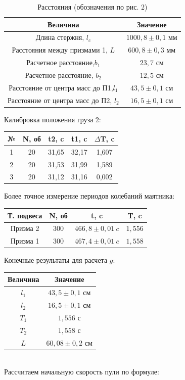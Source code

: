 \documentclass[a4paper]{article}
\begin{document}
\begin{table}[!h]
\centering
\caption{Расстояния (обозначения по рис. 2)}
\begin{tabular}{|c|c|}        \hline
Величина & Значение\\  \hline
Длина стержня, $l_c$ & $1000,8\pm 0,1$ мм\\ \hline
Расстояния между призмами 1, $L$ & $600,8\pm 0,3$ мм\\ \hline
Расчетное расстояние,$ b_1$ & $23,7$ см\\ \hline
Расчетное расстояние, $b_2$ & $12,5$ см\\ \hline
Расстояние от центра масс до П1,$l_1$ & $43,5\pm 0,1$ см\\ \hline
Расстояние от центра масс до П2, $l_2$ & $16,5\pm 0,1$ см\\ \hline
\end{tabular}
\end{table}

\noindent Калибровка положения груза 2:
\begin{table}[!h]
\centering
\begin{tabular}{|c|c|c|c|c|}      
\hline
№ & N, об & t2, c & t1, c & $\Delta$T, c \\  \hline
1 & 20 & 31,65 & 32,17 & 1,607 \\ \hline
2 & 20 & 31,53 & 31,99 & 1,589 \\ \hline
3 & 20 & 31,12 & 31,16 & 0,002\\ \hline
\end{tabular}
\end{table}

\noindent Более точное измерение периодов колебаний маятника:
\begin{table}[!h]
\centering
\begin{tabular}{|c|c|c|c|}        \hline
Т. подвеса & N, об & t, c & T, c\\  \hline
Призма 2 & 300 & $466,8 \pm 0,01\ c$ & $1,556$ \\ \hline
Призма 1 & 300 & $467,4 \pm 0,01\ c$ & $1,558$ \\ \hline
\end{tabular}
\end{table}

\noindent Конечные результаты для расчета $g$:
\begin{table}[!h]
\centering
\begin{tabular}{|c|c|}        \hline
Величина & Значение\\  \hline
$l_1$ & $43,5\pm 0,1$ см\\ \hline
$l_2$ & $16,5\pm 0,1$ см\\ \hline
$T_1$ & $1,556$ с\\ \hline
$T_2$ & $1,558$ с\\ \hline
$L$ & $60,08\pm 0,2$ см\\ \hline
\end{tabular}
\end{table} \\
\noindent
Рассчитаем начальную скорость пули по формуле:
\end{document}
